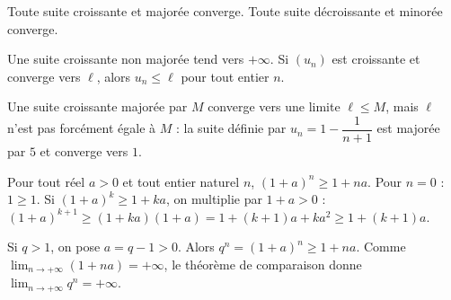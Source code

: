 \begin{theoreme}
Toute suite croissante et majorée converge. Toute suite décroissante et minorée converge.
\end{theoreme}

\begin{propriete}
Une suite croissante non majorée tend vers $+\infty$. Si $(u_n)$ est croissante et converge vers
$\ell$, alors $u_n\leq\ell$ pour tout entier $n$.
\end{propriete}

\begin{attention}
Une suite croissante majorée par $M$ converge vers une limite $\ell\leq M$, mais $\ell$ n'est pas
forcément égale à $M$ : la suite définie par $u_n=1-\dfrac{1}{n+1}$ est majorée par $5$ et converge vers $1$.
\end{attention}

\begin{demonstration}
 Pour tout réel $a>0$ et tout entier naturel $n$, $(1+a)^{n}\geq1+na$.
Pour $n=0$ : $1\geq1$. Si $(1+a)^{k}\geq1+ka$, on multiplie par $1+a>0$ :
$(1+a)^{k+1}\geq(1+ka)(1+a)=1+(k+1)a+ka^{2}\geq1+(k+1)a$.\par\vspace{1mm}
 Si $q>1$, on pose $a=q-1>0$. Alors $q^{n}=(1+a)^{n}\geq1+na$.
Comme $\displaystyle\lim_{n\to+\infty}(1+na)=+\infty$, le théorème de comparaison donne
$\displaystyle\lim_{n\to+\infty}q^{n}=+\infty$.
\end{demonstration}


